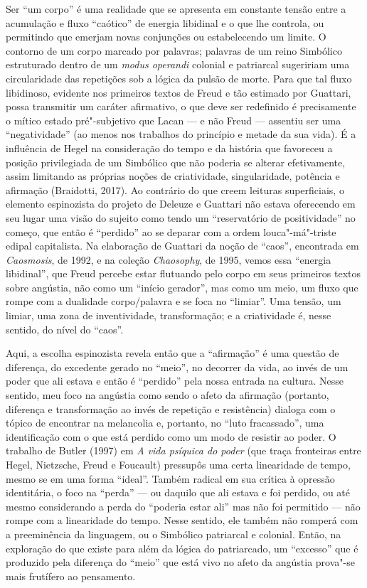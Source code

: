 Ser ``um corpo'' é uma realidade que se apresenta em constante tensão
entre a acumulação e fluxo ``caótico'' de energia libidinal e o que lhe
controla, ou permitindo que emerjam novas conjunções ou estabelecendo um
limite. O contorno de um corpo marcado por palavras; palavras de um
reino Simbólico estruturado dentro de um \emph{modus operandi} colonial
e patriarcal sugeririam uma circularidade das repetições sob a lógica da
pulsão de morte. Para que tal fluxo libidinoso, evidente nos primeiros
textos de Freud e tão estimado por Guattari, possa transmitir um caráter
afirmativo, o que deve ser redefinido é precisamente o mítico estado
pré"-subjetivo que Lacan --- e não Freud --- assentiu ser uma
``negatividade'' (ao menos nos trabalhos do princípio e metade da sua
vida). É a influência de Hegel na consideração do tempo e da história
que favoreceu a posição privilegiada de um Simbólico que não poderia se
alterar efetivamente, assim limitando as próprias noções de
criatividade, singularidade, potência e afirmação (Braidotti, 2017). Ao
contrário do que creem leituras superficiais, o elemento espinozista do
projeto de Deleuze e Guattari não estava oferecendo em seu lugar uma
visão do sujeito como tendo um ``reservatório de positividade'' no
começo, que então é ``perdido'' ao se deparar com a ordem
louca"-má"-triste edipal capitalista. Na elaboração de Guattari da noção
de ``caos'', encontrada em \emph{Caosmosis}, de 1992, e na coleção
\emph{Chaosophy}, de 1995, vemos essa ``energia libidinal'', que Freud
percebe estar flutuando pelo corpo em seus primeiros textos sobre
angústia, não como um ``início gerador'', mas como um meio, um fluxo que
rompe com a dualidade corpo/palavra e se foca no ``limiar''. Uma tensão,
um limiar, uma zona de inventividade, transformação; e a criatividade é,
nesse sentido, do nível do ``caos''.

Aqui, a escolha espinozista revela então que a ``afirmação'' é uma
questão de diferença, do excedente gerado no ``meio'', no decorrer da
vida, ao invés de um poder que ali estava e então é ``perdido'' pela
nossa entrada na cultura. Nesse sentido, meu foco na angústia como sendo
o afeto da afirmação (portanto, diferença e transformação ao invés de
repetição e resistência) dialoga com o tópico de encontrar na melancolia
e, portanto, no ``luto fracassado'', uma identificação com o que está
perdido como um modo de resistir ao poder. O trabalho de Butler (1997)
em \emph{A vida psíquica do poder} (que traça fronteiras entre Hegel,
Nietzsche, Freud e Foucault) pressupôs uma certa linearidade de tempo,
mesmo se em uma forma ``ideal''. Também radical em sua crítica à
opressão identitária, o foco na ``perda'' --- ou daquilo que ali estava e
foi perdido, ou até mesmo considerando a perda do ``poderia estar ali''
mas não foi permitido --- não rompe com a linearidade do tempo. Nesse
sentido, ele também não romperá com a preeminência da linguagem, ou o
Simbólico patriarcal e colonial. Então, na exploração do que existe para
além da lógica do patriarcado, um ``excesso'' que é produzido pela
diferença do ``meio'' que está vivo no afeto da angústia prova"-se mais
frutífero ao pensamento.

